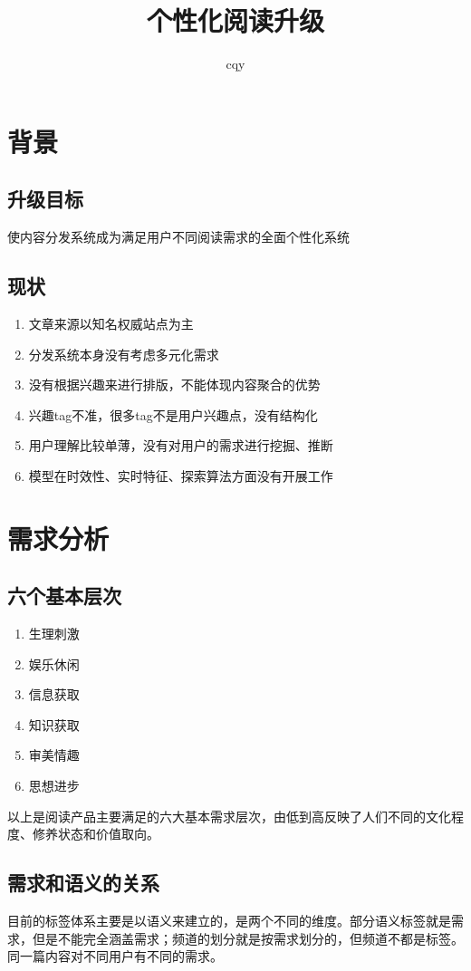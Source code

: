 \documentclass[11pt]{article}
\begin{document}
\title{个性化阅读升级}
\author{cqy}
\maketitle

%
\section{背景}
\subsection{升级目标}
使内容分发系统成为满足用户不同阅读需求的全面个性化系统
\subsection{现状}
\begin{enumerate}
\item 文章来源以知名权威站点为主
\item 分发系统本身没有考虑多元化需求
\item 没有根据兴趣来进行排版，不能体现内容聚合的优势
\item 兴趣tag不准，很多tag不是用户兴趣点，没有结构化
\item 用户理解比较单薄，没有对用户的需求进行挖掘、推断
\item 模型在时效性、实时特征、探索算法方面没有开展工作
\end{enumerate}

%
\section{需求分析}
\subsection{六个基本层次}
\begin{enumerate}
\item 生理刺激
\item 娱乐休闲
\item 信息获取
\item 知识获取
\item 审美情趣
\item 思想进步
\end{enumerate}

以上是阅读产品主要满足的六大基本需求层次，由低到高反映了人们不同的文化程度、修养状态和价值取向。

\subsection{需求和语义的关系}
目前的标签体系主要是以语义来建立的，是两个不同的维度。部分语义标签就是需求，但是不能完全涵盖需求；频道的划分就是按需求划分的，但频道不都是标签。同一篇内容对不同用户有不同的需求。
\end{document}
